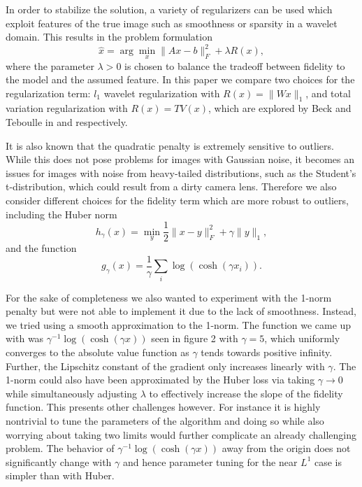 \documentclass[10pt,a4paper]{article}
\begin{document}
	In order to stabilize the solution, a variety of regularizers can be used which exploit features of the true image such as smoothness or sparsity in a wavelet domain. This results in the problem formulation
	\begin{equation}
	\hat{x} = \arg\min_{x} \| Ax - b \|_F^2 + \lambda R(x),
	\end{equation}
	where the parameter $\lambda > 0$ is chosen to balance the tradeoff between fidelity to the model and the assumed feature. In this paper we compare two choices for the regularization term: $l_1$ wavelet regularization with $R(x) = \| Wx \|_1$, and total variation regularization with $R(x) = TV(x)$, which are explored by Beck and Teboulle in \cite{TV} and \cite{FISTA} respectively.
	
	It is also known that the quadratic penalty is extremely sensitive to outliers. While this does not pose problems for images with Gaussian noise, it becomes an issues for images with noise from heavy-tailed distributions, such as the Student's t-distribution, which could result from a dirty camera lens. Therefore we also consider different choices for the fidelity term which are more robust to outliers, including the Huber norm
	\begin{equation} \label{huber}
	h_{\gamma}(x) = \min_y \frac{1}{2} \| x - y \|_F^2 + \gamma \| y \|_1,
	\end{equation}
	and the function
	\begin{equation} \label{log_cosh}
	g_{\gamma}(x) = \frac{1}{\gamma} \sum_i \log\left(\cosh\left(\gamma x_i\right)\right).
	\end{equation}
	
For the sake of completeness we also wanted to experiment with the 1-norm penalty but were not able to implement it due to the lack of smoothness.  Instead, we tried using a smooth approximation to the 1-norm.  The function we came up with was $\gamma^{-1} \log( \cosh(\gamma x))$ seen in figure 2 with $\gamma = 5$, which uniformly converges to the absolute value function as $\gamma$ tends towards positive infinity.  Further, the Lipschitz constant of the gradient only increases linearly with $\gamma$.  The 1-norm could also have been approximated by the Huber loss via taking $\gamma \to 0$ while simultaneously adjusting $\lambda$ to effectively increase the slope of the fidelity function.  This presents other challenges however.  For instance it is highly nontrivial to tune the parameters of the algorithm and doing so while also worrying about taking two limits would further complicate an already challenging problem.  The behavior of $\gamma^{-1} \log( \cosh(\gamma x))$ away from the origin does not significantly change with $\gamma$ and hence parameter tuning for the near $L^1$ case is simpler than with Huber.
	
\end{document}
